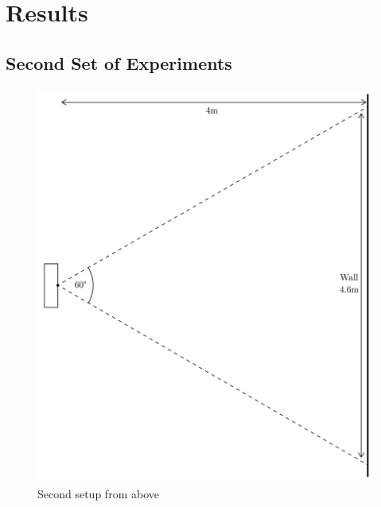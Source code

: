\documentclass[../thesis/thesis.tex]{subfiles}
\begin{document}
 \chapter{Results}

 \section{Second Set of Experiments}

 \begin{figure}
 \centering
 \includegraphics[width=\textwidth,page=1]{../diagrams/second-exp-setup.pdf}
 \caption{Second setup from above}
 \label{fig:exps:2setupabove}
 \end{figure}
\end{document}
